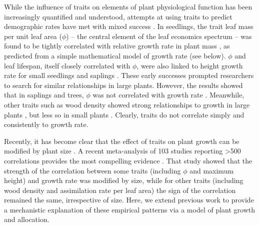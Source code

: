 \documentclass[9pt,twocolumn,twoside]{pnas-new}
\begin{document}
While the influence of traits on elements of plant physiological function has been increasingly quantified and understood, attempts at using traits to predict demographic rates have met with mixed success \citep{Poorter-2006, Poorter-2008,Wright-2010,Herault-2011,Paine-2015}. In seedlings, the trait leaf mass per unit leaf area ($\phi$) -- the central element of the leaf economics spectrum \citep{Wright-2004} -- was found to be tightly correlated with relative growth rate in plant mass \citep{Lambers-1992, Cornelissen-1996, Wright-2000}, as predicted from a simple mathematical model of growth rate (see below). $\phi$ and leaf lifespan, itself closely correlated with $\phi$, were also linked to height growth rate for small seedlings and saplings \citep{Reich-1992, Poorter-2006}. These early successes prompted researchers to search for similar relationships in large plants. However, the results showed that in saplings and trees, $\phi$ was not correlated with growth rate \citep{Poorter-2008, Wright-2010, Herault-2011, Paine-2015}. Meanwhile, other traits such as wood density showed strong relationships to growth in large plants \citep{Wright-2010,Herault-2011}, but less so in small plants \citep{Castro-1998}. Clearly, traits do not correlate simply and consistently to growth rate.

Recently, it has become clear that the effect of traits on plant growth can be modified by plant size \citep{Falster-2011, Ruger-2012, Iida-2014, Visser-2016, Gibert-2016}. A recent meta-analysis of 103 studies reporting \textgreater 500 correlations provides the most compelling evidence \citep{Gibert-2016}. That study showed that the strength of the correlation between some traits (including $\phi$ and maximum height) and growth rate was modified by size, while for other traits (including wood density and assimilation rate per leaf area) the sign of the correlation remained the same, irrespective of size. Here, we extend previous work \citep{Gibert-2016} to provide a mechanistic explanation of these empirical patterns via a model of plant growth and allocation.
\end{document}

